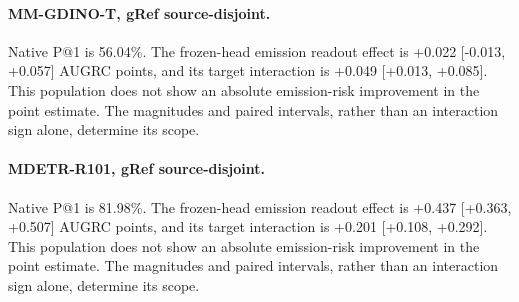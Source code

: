 \paragraph{MM-GDINO-T, gRef source-disjoint.} Native P@1 is 56.04\%. The frozen-head emission readout effect is +0.022 [-0.013, +0.057] AUGRC points, and its target interaction is +0.049 [+0.013, +0.085]. This population does not show an absolute emission-risk improvement in the point estimate. The magnitudes and paired intervals, rather than an interaction sign alone, determine its scope.

\paragraph{MDETR-R101, gRef source-disjoint.} Native P@1 is 81.98\%. The frozen-head emission readout effect is +0.437 [+0.363, +0.507] AUGRC points, and its target interaction is +0.201 [+0.108, +0.292]. This population does not show an absolute emission-risk improvement in the point estimate. The magnitudes and paired intervals, rather than an interaction sign alone, determine its scope.
